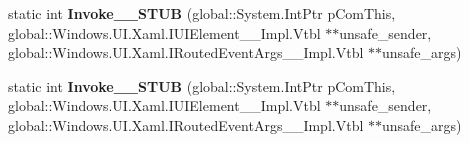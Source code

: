 \begin{DoxyCompactItemize}
static int {\bfseries Invoke\+\_\+\+\_\+\+S\+T\+UB} (global\+::\+System.\+Int\+Ptr p\+Com\+This, global\+::\+Windows.\+U\+I.\+Xaml.\+I\+U\+I\+Element\+\_\+\+\_\+\+Impl.\+Vtbl $\ast$$\ast$unsafe\+\_\+sender, global\+::\+Windows.\+U\+I.\+Xaml.\+I\+Routed\+Event\+Args\+\_\+\+\_\+\+Impl.\+Vtbl $\ast$$\ast$unsafe\+\_\+args)
\item 
\mbox{\label{struct_windows_1_1_foundation_1_1_typed_event_handler___a___windows___u_i___xaml___u_i_element__783b71f1d8ea86c7251f457c77949e7c_aad5eced768d466991fe988284c281a37}} 
static int {\bfseries Invoke\+\_\+\+\_\+\+S\+T\+UB} (global\+::\+System.\+Int\+Ptr p\+Com\+This, global\+::\+Windows.\+U\+I.\+Xaml.\+I\+U\+I\+Element\+\_\+\+\_\+\+Impl.\+Vtbl $\ast$$\ast$unsafe\+\_\+sender, global\+::\+Windows.\+U\+I.\+Xaml.\+I\+Routed\+Event\+Args\+\_\+\+\_\+\+Impl.\+Vtbl $\ast$$\ast$unsafe\+\_\+args)
\end{DoxyCompactItemize}
